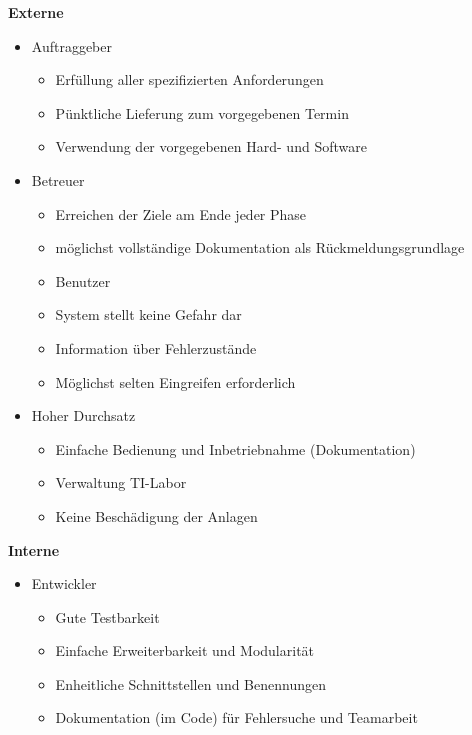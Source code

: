 \textbf{Externe}
    \begin{itemize}
        \item Auftraggeber
        \begin{itemize}
            \item Erfüllung aller spezifizierten Anforderungen
            \item Pünktliche Lieferung zum vorgegebenen Termin
            \item Verwendung der vorgegebenen Hard- und Software
        \end{itemize}
        \item Betreuer
        \begin{itemize}
            \item Erreichen der Ziele am Ende jeder Phase
            \item möglichst vollständige Dokumentation als Rückmeldungsgrundlage
            \item Benutzer
        \end{itemize}
        \begin{itemize}
            \item System stellt keine Gefahr dar
            \item Information über Fehlerzustände
            \item Möglichst selten Eingreifen erforderlich
        \end{itemize}
        \item Hoher Durchsatz
        \begin{itemize}
            \item Einfache Bedienung und Inbetriebnahme (Dokumentation)
            \item Verwaltung TI-Labor
            \item Keine Beschädigung der Anlagen
        \end{itemize}
    \end{itemize}
\newline
\textbf{Interne}
    \begin{itemize}
        \item Entwickler
        \begin{itemize}
        \item Gute Testbarkeit
        \item Einfache Erweiterbarkeit und Modularität
        \item Enheitliche Schnittstellen und Benennungen
        \item Dokumentation (im Code) für Fehlersuche und Teamarbeit
        \end{itemize}
    \end{itemize}

